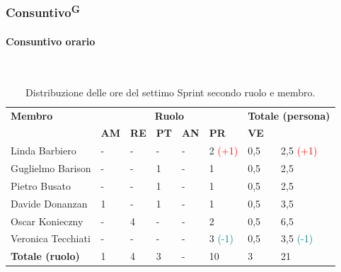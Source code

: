 \documentclass[8pt]{article}
\newcommand{\glossterm}[1]{#1\textsuperscript{G}} %
\newcommand{\subsubsubsection}[1]{\paragraph{#1}\mbox{}\\}
\begin{document}
\subsubsection{\glossterm{Consuntivo}}
\subsubsubsection{Consuntivo orario}
\begin{table}[ht!]
	\centering
	\begin{tabular}{p{3cm} p{1.4cm} p{1.6cm} p{1.7cm} p{1.4cm} p{1.4cm} p{1.5cm} p{2cm}}
		\toprule
        \textbf{Membro} & \multicolumn{5}{c}{\textbf{Ruolo}} & \multicolumn{2}{r}{\textbf{Totale (persona)}}\\
		& \textbf{AM} & \textbf{RE} & \textbf{PT} & \textbf{AN} & \textbf{PR} & \textbf{VE}\\
		\midrule
        Linda Barbiero          & - & - & - & - & 2 \textcolor{red}{(+1)} & 0,5 & 2,5 \textcolor{red}{(+1)} \\
        Guglielmo Barison       & - & - & 1 & - & 1 & 0,5 & 2,5 \\
        Pietro Busato           & - & - & 1 & - & 1 & 0,5 & 2,5 \\
        Davide Donanzan         & 1 & - & 1 & - & 1 & 0,5 & 3,5 \\
        Oscar Konieczny         & - & 4 & - & - & 2 & 0,5 & 6,5 \\
        Veronica Tecchiati      & - & - & - & - & 3 \textcolor{teal}{(-1)} & 0,5 & 3,5 \textcolor{teal}{(-1)} \\
        \bottomrule
        \textbf{Totale (ruolo)} & 1 & 4 & 3 & - & 10 & 3 & 21 \\
		\bottomrule
	\end{tabular}
	\caption{Distribuzione delle ore del settimo Sprint secondo ruolo e membro.}
	\label{table:Distribuzione delle ore del settimo Sprint secondo ruolo e membro}
\end{table}
\end{document}
